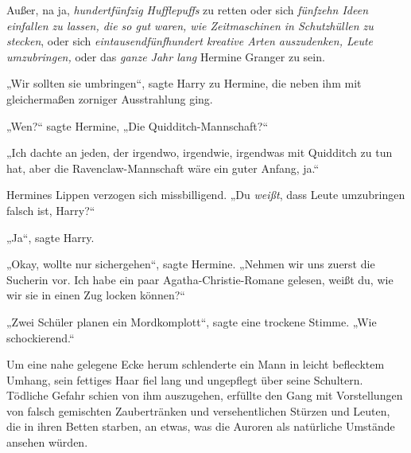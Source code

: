 Außer, na ja, \emph{hundertfünfzig Hufflepuffs} zu retten oder sich \emph{fünfzehn Ideen einfallen zu lassen, die so gut waren, wie Zeitmaschinen in Schutzhüllen zu stecken}, oder sich \emph{eintausendfünfhundert kreative Arten auszudenken, Leute umzubringen,} oder das \emph{ganze Jahr lang} Hermine Granger zu sein.

„Wir sollten sie umbringen“, sagte Harry zu Hermine, die neben ihm mit gleichermaßen zorniger Ausstrahlung ging.

„Wen?“ sagte Hermine,
„Die Quidditch-Mannschaft?“

„Ich dachte an jeden, der irgendwo, irgendwie, irgendwas mit Quidditch zu tun hat, aber die Ravenclaw-Mannschaft wäre ein guter Anfang, ja.“

Hermines Lippen verzogen sich missbilligend.
„Du \emph{weißt}, dass Leute umzubringen falsch ist, Harry?“

„Ja“, sagte Harry.

„Okay, wollte nur sichergehen“, sagte Hermine.
„Nehmen wir uns zuerst die Sucherin vor. Ich habe ein paar Agatha-Christie-Romane gelesen, weißt du, wie wir sie in einen Zug locken können?“

„Zwei Schüler planen ein Mordkomplott“, sagte eine trockene Stimme.
„Wie schockierend.“

Um eine nahe gelegene Ecke herum schlenderte ein Mann in leicht beflecktem Umhang, sein fettiges Haar fiel lang und ungepflegt über seine Schultern. Tödliche Gefahr schien von ihm auszugehen, erfüllte den Gang mit Vorstellungen von falsch gemischten Zaubertränken und versehentlichen Stürzen und Leuten, die in ihren Betten starben, an etwas, was die Auroren als natürliche Umstände ansehen würden.

